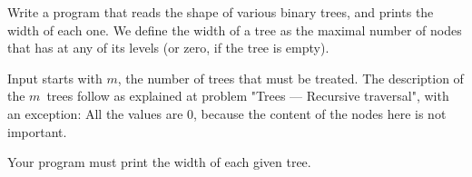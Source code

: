 


\Statement

Write a program that reads the shape of various binary trees,
and prints the width of each one.
We define the width of a tree
as the maximal number of nodes that has at any of its levels
(or zero, if the tree is empty).


\Input


Input starts with $m$, the number of trees that must be treated.
The description of the $m$~trees follow
as explained at problem "Trees --- Recursive traversal", with an exception:
All the values are 0,
because the content of the nodes here is not important.


\Output

Your program must print the width of each given tree.



\SampleOneCol

